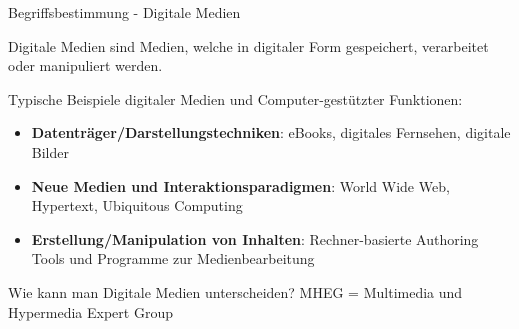
\clearpage


\setcounter{bsunit}{2}



\renewcommand{\textbufferB}{Begriffsbestimmung - Digitale Medien}
\begin{bsslide}
  \begin{center}
 \vspace{0.4\textheight}
    \large\textbufferB
  \end{center}
\end{bsslide}


\begin{bsslide}
  \begin{definition}
    Digitale Medien sind Medien, welche in digitaler Form
    gespeichert, verarbeitet oder manipuliert werden.
  \end{definition}
  Typische Beispiele digitaler Medien und Computer-gest\"utzter Funktionen:
  \begin{itemize}
    \item\textbf{ Datentr\"ager/Darstellungstechniken}: eBooks, digitales
    Fernsehen, digitale Bilder
    \item \textbf{Neue Medien und Interaktionsparadigmen}:  World Wide Web, Hypertext,
    Ubiquitous Computing
    \item \textbf{Erstellung/Manipulation von Inhalten}: Rechner-basierte Authoring
    Tools und Programme zur Medienbearbeitung
  \end{itemize}
  \end{bsslide}
  
\begin{bsslide}
    Wie kann man Digitale Medien unterscheiden?
     \small
    MHEG = Multimedia und Hypermedia Expert Group
  \end{bsslide}
  
